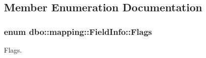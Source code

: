 \subsection{Member Enumeration Documentation}
\hypertarget{classdbo_1_1mapping_1_1_field_info_ace9623c079f46b2c932e339e68c001dd}{
\subsubsection[{Flags}]{\setlength{\rightskip}{0pt plus 5cm}enum {\bf dbo\+::mapping\+::\+Field\+Info\+::\+Flags}}}\label{classdbo_1_1mapping_1_1_field_info_ace9623c079f46b2c932e339e68c001dd}


Flags. 

